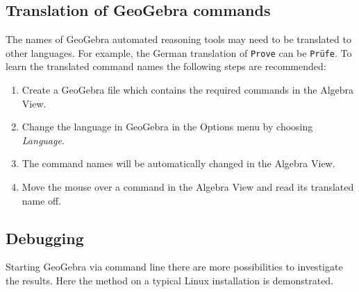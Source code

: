 \documentclass{article}
\begin{document}
\subsection{Translation of GeoGebra commands}

The names of GeoGebra automated reasoning tools may need to be translated to other languages. For example, the German translation of \texttt{Prove} can be \texttt{Pr\"ufe}.
To learn the translated command names the following steps are recommended:

\begin{enumerate}
\item Create a GeoGebra file which contains the required commands in the Algebra View.
\item Change the language in GeoGebra in the Options menu by choosing \textit{Language}.
\item The command names will be automatically changed in the Algebra View.
\item Move the mouse over a command in the Algebra View and read its translated name off.
\end{enumerate}

\subsection{Debugging}
Starting GeoGebra via command line there are more possibilities to investigate the results. Here the method on a typical Linux installation is demonstrated.
\end{document}
